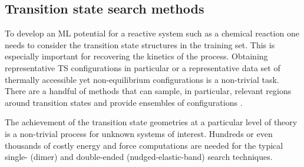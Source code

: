 \documentclass[9pt,bestpractices]{livecoms}
\begin{document}



\subsection{Transition state search methods}
To develop an ML potential for a reactive system such as a chemical reaction one
needs to consider the transition state structures in the training set. This is
especially important for recovering the kinetics of the process. Obtaining
representative TS configurations in particular or a representative data set of thermally accessible yet non-equilibrium configurations is a non-trivial task. There are a handful of
methods that can sample, in particular, relevant regions around transition states and provide
ensembles of configurations \cite{martinez-nunezAutomatedTransitionState2015,
mantzEnsembleTransitionState2009, debnathGaussianMixtureBasedEnhanced2020,
rayRareEventKinetics2022,heinenTransitionStateSearch2022}.

%


The achievement of the transition state geometries at a particular level
of theory is a non-trivial process for unknown systems of interest. 
Hundreds or even thousands of costly energy and force computations 
are needed for the typical single- (dimer) and double-ended (nudged-elastic-band) 
search techniques.
\end{document}
